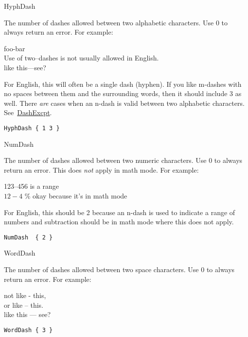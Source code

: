 \begin{chktexrclistvar}{HyphDash}

The number of dashes allowed between two alphabetic characters.
Use 0 to always return an error.  For example:
\begin{errexam}
foo-bar \\
Use of two--dashes is not usually allowed in English. \\
like this---see?
\end{errexam}

For English, this will often be a single dash (hyphen).  If you like
m-dashes with no spaces between them and the surrounding words, then
it should include 3 as well.  There \emph{are} cases when an n-dash
is valid between two alphabetic characters.  See~\hyperref[rc:DashExcpt]{DashExcpt}.

\chktexrcdefault\begin{verbatim}
HyphDash { 1 3 }
\end{verbatim}
\end{chktexrclistvar}


\begin{chktexrclistvar}{NumDash}

The number of dashes allowed between two numeric characters.
Use 0 to always return an error.  This does \emph{not} apply in
math mode.  For example:
\begin{errexam}
123--456 is a range \\
$12-4$ \% okay because it's in math mode
\end{errexam}

For English, this should be 2 because an n-dash is used to indicate
a range of numbers and subtraction should be in math mode where this
does not apply.

\chktexrcdefault\begin{verbatim}
NumDash  { 2 }
\end{verbatim}
\end{chktexrclistvar}


\begin{chktexrclistvar}{WordDash}

The number of dashes allowed between two space characters.
Use 0 to always return an error.  For example:
\begin{errexam}
not like - this,  \\
or like -- this.  \\
like this --- see?
\end{errexam}

\chktexrcdefault\begin{verbatim}
WordDash { 3 }
\end{verbatim}
\end{chktexrclistvar}


